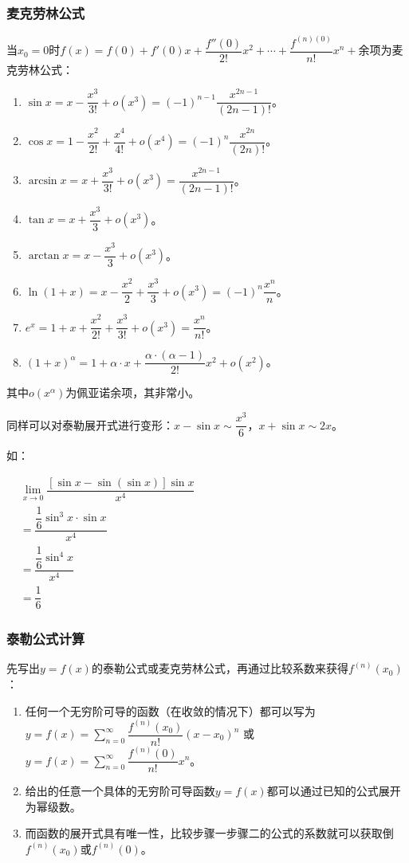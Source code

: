 \documentclass[UTF8, 12pt]{ctexart}
\begin{document}
\subsubsection{麦克劳林公式}

当$x_0=0$时$f(x)=f(0)+f'(0)x+\dfrac{f''(0)}{2!}x^2+\cdots+\dfrac{f^{(n)(0)}}{n!}x^n+\text{余项}$为麦克劳林公式：

\begin{enumerate}
    \item $\sin x=x-\dfrac{x^3}{3!}+o(x^3)=(-1)^{n-1}\dfrac{x^{2n-1}}{(2n-1)!}$。
    \item $\cos x=1-\dfrac{x^2}{2!}+\dfrac{x^4}{4!}+o(x^4)=(-1)^n\dfrac{x^{2n}}{(2n)!}$。
    \item $\arcsin x=x+\dfrac{x^3}{3!}+o(x^3)=\dfrac{x^{2n-1}}{(2n-1)!}$。
    \item $\tan x=x+\dfrac{x^3}{3}+o(x^3)$。
    \item $\arctan x=x-\dfrac{x^3}{3}+o(x^3)$。
    \item $\ln(1+x)=x-\dfrac{x^2}{2}+\dfrac{x^3}{3}+o(x^3)=(-1)^n\dfrac{x^n}{n}$。
    \item $e^x=1+x+\dfrac{x^2}{2!}+\dfrac{x^3}{3!}+o(x^3)=\dfrac{x^n}{n!}$。
    \item $(1+x)^\alpha=1+\alpha\cdot x+\dfrac{\alpha\cdot(\alpha-1)}{2!}x^2+o(x^2)$。
\end{enumerate}

其中$o(x^\alpha)$为佩亚诺余项，其非常小。

同样可以对泰勒展开式进行变形：$x-\sin x\sim\dfrac{x^3}{6}$，$x+\sin x\sim 2x$。

如：

$
\begin{aligned}
    & \lim\limits_{x\to 0}\dfrac{[\sin x-\sin(\sin x)]\sin x}{x^4} \\
    & =\dfrac{\dfrac{1}{6}\sin^3x\cdot\sin x}{x^4} \\
    & =\dfrac{\dfrac{1}{6}\sin^4x}{x^4} \\
    & =\dfrac{1}{6}
\end{aligned}
$

\subsubsection{泰勒公式计算}

先写出$y=f(x)$的泰勒公式或麦克劳林公式，再通过比较系数来获得$f^{(n)}(x_0)$：

\begin{enumerate}
    \item 任何一个无穷阶可导的函数（在收敛的情况下）都可以写为 \\
    $y=f(x)=\sum_{n=0}^\infty\dfrac{f^{(n)}(x_0)}{n!}(x-x_0)^n$ 或 $y=f(x)=\sum_{n=0}^\infty\dfrac{f^{(n)}(0)}{n!}x^n$。
    \item 给出的任意一个具体的无穷阶可导函数$y=f(x)$都可以通过已知的公式展开为幂级数。
    \item 而函数的展开式具有唯一性，比较步骤一步骤二的公式的系数就可以获取倒$f^{(n)}(x_0)$或$f^{(n)}(0)$。
\end{enumerate}
\end{document}
